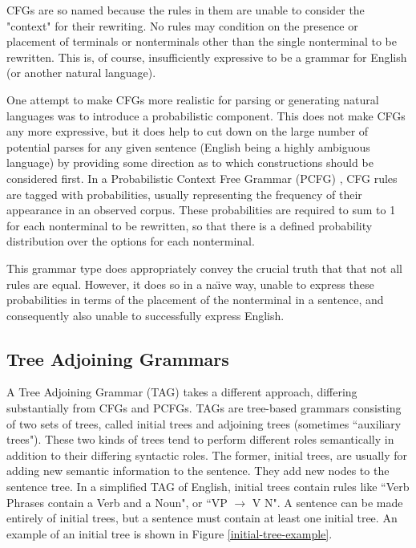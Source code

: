 CFGs are so named because the rules in them are unable to consider the "context" for
their rewriting.  No rules may condition on the presence or placement of terminals
or nonterminals other than the single nonterminal to be rewritten.  This is, of course,
insufficiently expressive to be a grammar for English (or another natural language)\cite{jurafsky_textbook}.

One attempt to make CFGs more realistic for parsing or generating natural languages was to
introduce a probabilistic component.  This does not make CFGs any more expressive, but it
does help to cut down on the large number of potential parses for any given sentence
(English being a highly ambiguous language) by providing some direction as to which constructions
should be considered first.  In a Probabilistic Context Free Grammar (PCFG) \cite{pcfg_textbook}, CFG
rules are tagged with probabilities, usually representing the frequency of their appearance in
an observed corpus.  These probabilities are required to sum to 1 for each nonterminal to
be rewritten, so that there is a defined probability distribution over the options for each nonterminal.

This grammar type does appropriately convey the crucial truth that that not all rules are equal.
However, it does so in a  na\"{\i}ve way, unable to express these probabilities in terms of the placement
of the nonterminal in a sentence, and consequently also unable to successfully express English.

\subsection{Tree Adjoining Grammars}

A Tree Adjoining Grammar (TAG) takes a different approach, differing substantially from CFGs and PCFGs.
TAGs are tree-based grammars consisting of two sets of trees, called initial
trees and adjoining trees (sometimes ``auxiliary trees").  These two kinds of trees tend to perform
different roles semantically in addition to their differing syntactic roles.  The former,
initial trees, are usually for adding new semantic information to the sentence.  They
add new nodes to the sentence tree.  In a simplified TAG of English,
initial trees contain rules like ``Verb Phrases contain a Verb and a Noun", or ``VP $\rightarrow$ V N".
A sentence can be made entirely of initial trees, but a sentence must contain at least
one initial tree.  An example of an initial tree is shown in Figure \ref{initial-tree-example}.

